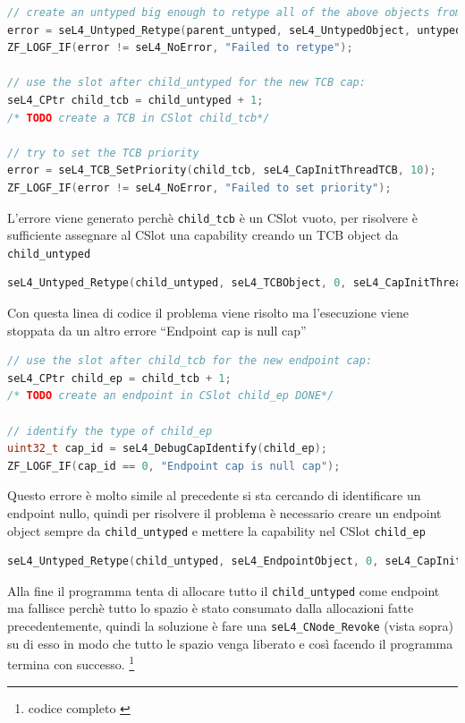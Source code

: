 \begin{lstlisting}[language=C++]
// create an untyped big enough to retype all of the above objects from
error = seL4_Untyped_Retype(parent_untyped, seL4_UntypedObject, untyped_size_bits, seL4_CapInitThreadCNode, 0, 0, child_untyped, 1);
ZF_LOGF_IF(error != seL4_NoError, "Failed to retype");

// use the slot after child_untyped for the new TCB cap:
seL4_CPtr child_tcb = child_untyped + 1;
/* TODO create a TCB in CSlot child_tcb*/

// try to set the TCB priority
error = seL4_TCB_SetPriority(child_tcb, seL4_CapInitThreadTCB, 10);
ZF_LOGF_IF(error != seL4_NoError, "Failed to set priority");
\end{lstlisting}
L'errore viene generato perchè \texttt{child\_tcb} è un CSlot vuoto, per risolvere è sufficiente assegnare al CSlot una capability creando un TCB object da \texttt{child\_untyped}
\begin{lstlisting}[language=C++]
seL4_Untyped_Retype(child_untyped, seL4_TCBObject, 0, seL4_CapInitThreadCNode, 0, 0, child_tcb, 1);
\end{lstlisting}
Con questa linea di codice il problema viene risolto ma l'esecuzione viene stoppata da un altro errore “Endpoint cap is null cap”
\begin{lstlisting}[language=C++]
// use the slot after child_tcb for the new endpoint cap:
seL4_CPtr child_ep = child_tcb + 1;
/* TODO create an endpoint in CSlot child_ep DONE*/

// identify the type of child_ep
uint32_t cap_id = seL4_DebugCapIdentify(child_ep);
ZF_LOGF_IF(cap_id == 0, "Endpoint cap is null cap");
\end{lstlisting}
Questo errore è molto simile al precedente si sta cercando di identificare un endpoint nullo, quindi per risolvere il problema è necessario creare un endpoint object sempre da \texttt{child\_untyped} e mettere la capability nel CSlot \texttt{child\_ep}
\begin{lstlisting}[language=C++]
seL4_Untyped_Retype(child_untyped, seL4_EndpointObject, 0, seL4_CapInitThreadCNode, 0, 0, child_ep, 1);
\end{lstlisting}
Alla fine il programma tenta di allocare tutto il \texttt{child\_untyped} come endpoint ma fallisce perchè tutto lo spazio è stato consumato dalla allocazioni fatte precedentemente, quindi la soluzione è fare una \texttt{seL4\_CNode\_Revoke} (vista sopra) su di esso in modo che tutto le spazio venga liberato e così facendo il programma termina con successo. \footnote{codice completo \cite{untyped}}
